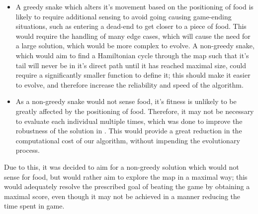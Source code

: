 \documentclass[british,10pt,a4paper]{article}
\begin{document}
\begin{itemize}
	\item A greedy snake which alters it's movement based on the positioning of food is likely to require additional sensing to avoid going causing game-ending situations, such as entering a dead-end to get closer to a piece of food. This would require the handling of many edge cases, which will cause the need for a large solution, which would be more complex to evolve. A non-greedy snake, which would aim to find a Hamiltonian cycle through the map such that it's tail will never be in it's direct path until it has reached maximal size, could require a significantly smaller function to define it; this should make it easier to evolve, and therefore increase the reliability and speed of the algorithm.
	\item As a non-greedy snake would not sense food, it's fitness is unlikely to be greatly affected by the positioning of food. Therefore, it may not be necessary to evaluate each individual multiple times, which was done to improve the robustness of the solution in \cite{Ehlis2000-sz}. This would provide a great reduction in the computational cost of our algorithm, without impending the evolutionary process.
\end{itemize}
Due to this, it was decided to aim for a non-greedy solution which would not sense for food, but would rather aim to explore the map in a maximal way; this would adequately resolve the prescribed goal of beating the game by obtaining a maximal score, even though it may not be achieved in a manner reducing the time spent in game.
\end{document}
